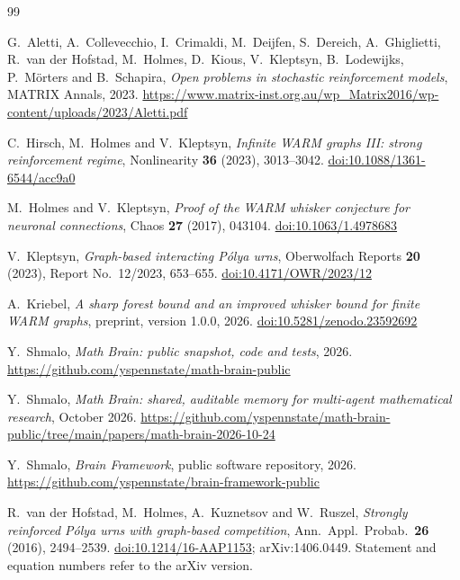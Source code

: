 \documentclass[11pt]{article}
\theoremstyle{definition}
\theoremstyle{remark}
\providecommand{\doi}[1]{\href{https://doi.org/#1}{doi:#1}}
\begin{document}
\begin{thebibliography}{99}

G.~Aletti, A.~Collevecchio, I.~Crimaldi, M.~Deijfen, S.~Dereich, A.~Ghiglietti, R.~van der Hofstad, M.~Holmes,
D.~Kious, V.~Kleptsyn, B.~Lodewijks, P.~M\"orters and B.~Schapira,
\emph{Open problems in stochastic reinforcement models},
MATRIX Annals, 2023.
\url{https://www.matrix-inst.org.au/wp_Matrix2016/wp-content/uploads/2023/Aletti.pdf}

C.~Hirsch, M.~Holmes and V.~Kleptsyn,
\emph{Infinite WARM graphs III: strong reinforcement regime},
Nonlinearity \textbf{36} (2023), 3013--3042.
\doi{10.1088/1361-6544/acc9a0}

M.~Holmes and V.~Kleptsyn,
\emph{Proof of the WARM whisker conjecture for neuronal connections},
Chaos \textbf{27} (2017), 043104.
\doi{10.1063/1.4978683}

V.~Kleptsyn,
\emph{Graph-based interacting P\'olya urns},
Oberwolfach Reports \textbf{20} (2023), Report No.~12/2023, 653--655.
\doi{10.4171/OWR/2023/12}

A.~Kriebel,
\emph{A sharp forest bound and an improved whisker bound for finite WARM graphs},
preprint, version 1.0.0, 2026.
\doi{10.5281/zenodo.23592692}

Y.~Shmalo, \emph{Math Brain: public snapshot, code and tests}, 2026.
\url{https://github.com/yspennstate/math-brain-public}

Y.~Shmalo, \emph{Math Brain: shared, auditable memory for multi-agent mathematical research}, October 2026.
\url{https://github.com/yspennstate/math-brain-public/tree/main/papers/math-brain-2026-10-24}

Y.~Shmalo, \emph{Brain Framework}, public software repository, 2026.
\url{https://github.com/yspennstate/brain-framework-public}

R.~van der Hofstad, M.~Holmes, A.~Kuznetsov and W.~Ruszel,
\emph{Strongly reinforced P\'olya urns with graph-based competition},
Ann.\ Appl.\ Probab.\ \textbf{26} (2016), 2494--2539.
\doi{10.1214/16-AAP1153}; arXiv:1406.0449. Statement and equation numbers refer to the arXiv version.

\end{thebibliography}
\end{document}
